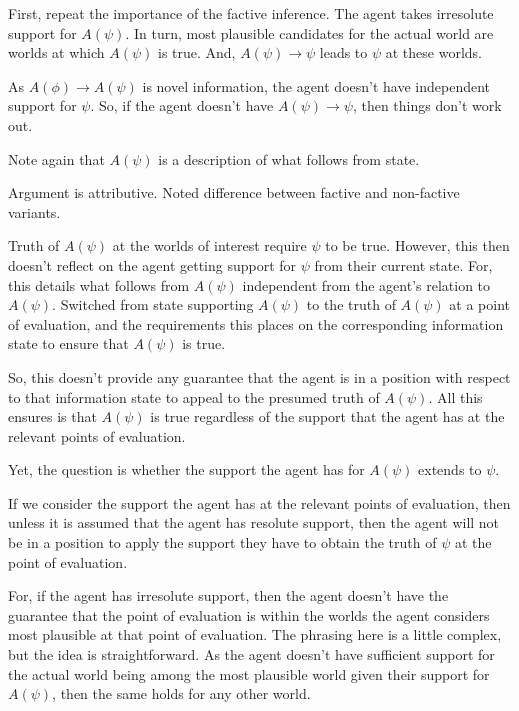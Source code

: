 \documentclass[10pt]{article}
\begin{document}
\begin{note}
  First, repeat the importance of the factive inference.
  The agent takes irresolute support for \(A(\psi)\).
  In turn, most plausible candidates for the actual world are worlds at which \(A(\psi)\) is true.
  And, \(A(\psi) \rightarrow \psi\) leads to \(\psi\) at these worlds.

  As \(A(\phi) \rightarrow A(\psi)\) is novel information, the agent doesn't have independent support for \(\psi\).
  So, if the agent doesn't have \(A(\psi) \rightarrow \psi\), then things don't work out.

  Note again that \(A(\psi)\) is a description of what follows from state.

  Argument is attributive.
  Noted difference between factive and non-factive variants.

  Truth of \(A(\psi)\) at the worlds of interest require \(\psi\) to be true.
  However, this then doesn't reflect on the agent getting support for \(\psi\) from their current state.
  For, this details what follows from \(A(\psi)\) independent from the agent's relation to \(A(\psi)\).
  Switched from state supporting \(A(\psi)\) to the truth of \(A(\psi)\) at a point of evaluation, and the requirements this places on the corresponding information state to ensure that \(A(\psi)\) is true.

  So, this doesn't provide any guarantee that the agent is in a position with respect to that information state to appeal to the presumed truth of \(A(\psi)\).
  All this ensures is that \(A(\psi)\) is true regardless of the support that the agent has at the relevant points of evaluation.

  Yet, the question is whether the support the agent has for \(A(\psi)\) extends to \(\psi\).

  If we consider the support the agent has at the relevant points of evaluation, then unless it is assumed that the agent has resolute support, then the agent will not be in a position to apply the support they have to obtain the truth of \(\psi\) at the point of evaluation.

  For, if the agent has irresolute support, then the agent doesn't have the guarantee that the point of evaluation is within the worlds the agent considers most plausible at that point of evaluation.
  The phrasing here is a little complex, but the idea is straightforward.
  As the agent doesn't have sufficient support for the actual world being among the most plausible world given their support for \(A(\psi)\), then the same holds for any other world.


\end{note}
\end{document}
